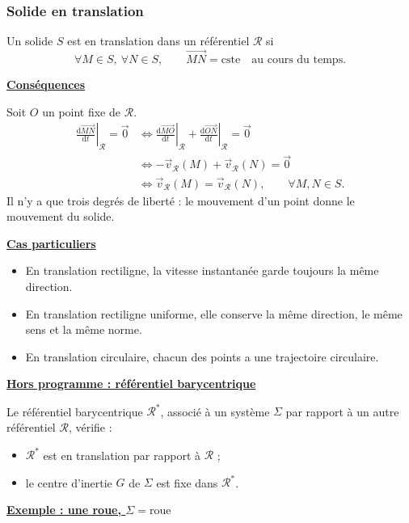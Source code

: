 \documentclass[11pt,a4paper]{article}
\newcommand{\dd}{\mathrm d}
\newcommand{\cste}{\mathrm{cste}}
\newcommand{\titr}[1]{\par\textbf{\underline{#1}}\par\nopagebreak[3]}
\newcommand{\R}{\mathcal R}
\newcommand{\D}[2]{\left.\frac{\dd #1}{\dd t}\right|_{#2}}
\newcommand{\V}[1]{\vec v_{#1}}
\newcommand{\rep}[1]{\draw[->] (0,0)--(1.15,0);\draw[->] (0,0)--(0,1.3);\draw[->] (0,0)--(-.65,-.8);\node[below right] at (.2,-.15){$#1$};}
\begin{document}
\subsubsection{Solide en translation}
Un solide $S$ est en translation dans un référentiel $\R$ si
\[\forall M\in S,\ \forall N\in S,\qquad\overrightarrow{MN}=\cste\quad\text{au cours du temps}.\]
\titr{Conséquences}
Soit $O$ un point fixe de $\R$.
\begin{align*}
\D{\overrightarrow{MN}}{\R}=\vec0
&\Longleftrightarrow \D{\overrightarrow{MO}}{\R}+\D{\overrightarrow{ON}}{\R}=\vec0\\
&\Longleftrightarrow-\V{\R}(M)+\V{\R}(N)=\vec0\\
&\Longleftrightarrow\V{\R}(M)=\V{\R}(N),\qquad\forall M,N\in S.
\end{align*}
Il n'y a que trois degrés de liberté : le mouvement d'un point donne le mouvement du solide.
\titr{Cas particuliers}
\begin{itemize}
\item En translation rectiligne, la vitesse instantanée garde toujours la même direction.
\item En translation rectiligne uniforme, elle conserve la même direction, le même sens et la même norme.
\item En translation circulaire, chacun des points a une trajectoire circulaire.
\end{itemize}
\titr{Hors programme : référentiel barycentrique}
Le référentiel barycentrique $\R^*$, associé à un système $\Sigma$ par rapport à un autre référentiel $\R$, vérifie :
\begin{itemize}
\item $\R^*$ est en translation par rapport à $\R$ ;
\item le centre d'inertie $G$ de $\Sigma$ est fixe dans $\R^*$.
\end{itemize}
\begin{exemple}
\titr{Exemple : une roue, $\Sigma=\text{roue}$}
\begin{center}\end{center}
\end{exemple}
\end{document}
